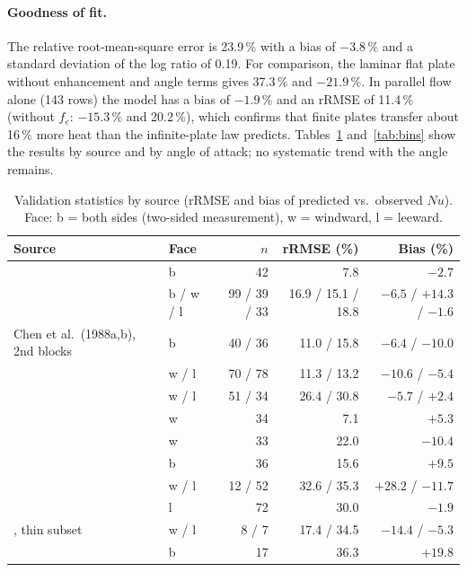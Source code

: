 \documentclass[11pt,a4paper]{article}
\newcommand{\Nu}{\mathit{Nu}}
\begin{document}
\paragraph{Goodness of fit.} The relative root-mean-square error is 23.9\,\% with a bias of $-3.8\,\%$ and a standard deviation of the log ratio of 0.19. For comparison, the laminar flat plate without enhancement and angle terms gives 37.3\,\% and $-21.9\,\%$. In parallel flow alone (143 rows) the model has a bias of $-1.9\,\%$ and an rRMSE of 11.4\,\% (without $f_e$: $-15.3\,\%$ and 20.2\,\%), which confirms that finite plates transfer about 16\,\% more heat than the infinite-plate law predicts. Tables~\ref{tab:sources} and~\ref{tab:bins} show the results by source and by angle of attack; no systematic trend with the angle remains.

\begin{table}[ht]
\centering\small
\caption{Validation statistics by source (rRMSE and bias of predicted vs.\ observed $\Nu$). Face: b = both sides (two-sided measurement), w = windward, l = leeward.}\label{tab:sources}
\footnotesize
\begin{tabular}{l l r r r}
\toprule
Source & Face & $n$ & rRMSE (\%) & Bias (\%)\\
\midrule
\citet{chen1988a} & b & 42 & 7.8 & $-2.7$\\
\citet{chen1988b} & b / w / l & 99 / 39 / 33 & 16.9 / 15.1 / 18.8 & $-6.5$ / $+14.3$ / $-1.6$\\
Chen et al.\ (1988a,b), 2nd blocks & b & 40 / 36 & 11.0 / 15.8 & $-6.4$ / $-10.0$\\
\citet{haseba1973} & w / l & 70 / 78 & 11.3 / 13.2 & $-10.6$ / $-5.4$\\
\citet{haseba1984} & w / l & 51 / 34 & 26.4 / 30.8 & $-5.7$ / $+2.4$\\
\citet{sparrow1977} & w & 34 & 7.1 & $+5.3$\\
\citet{sparrow1979} & w & 33 & 22.0 & $-10.4$\\
\citet{parkhurst1968} & b & 36 & 15.6 & $+9.5$\\
\citet{powell1940} & w / l & 12 / 52 & 32.6 / 35.3 & $+28.2$ / $-11.7$\\
\citet{schuepp1993} & l & 72 & 30.0 & $-1.9$\\
\citet{ramirez2002}, thin subset & w / l & 8 / 7 & 17.4 / 34.5 & $-14.4$ / $-5.3$\\
\citet{kobus2006} & b & 17 & 36.3 & $+19.8$\\
\bottomrule
\end{tabular}
\end{table}
\end{document}
